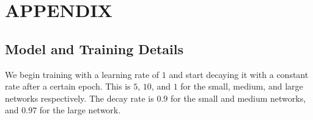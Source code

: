 \appendix
\chapter{\LARGE APPENDIX}

\iffalse
\section{More detailed justification of Equation \eqref{eqn:Jaug_matching_logits}}
Here we use a more general approach to derive \eqref{eqn:Jaug_matching_logits} and we show that in contrast to approach of section \ref{section:RE}, the new approach works for any value of $\tau>0$. Recall from section \ref{section:RE} that the gradient of $\Jaug_t$ is equal to
\begin{equation*}
\mathop{\nabla}\Jaug_t
=\frac{1}{\tau}(\yhat_t-\ytilde_t).
\end{equation*}
Now putting the gradient equal to zero implies that $\yhat_{t,i}=\ytilde_{t,i}$ which is equivalent to
\begin{equation*}
\frac{\xp{\<h_t,w_i\>/\tau} }{\sum_{j\in V}\xp{\<h_t,w_j\>/\tau}} = \frac{\xp{\<u_t,l_i\>/\tau} }{\sum_{j\in V}\xp{\<u_t,l_j\>/\tau}}.
\end{equation*}
Letting
\begin{align*}
a_i &= \xp{\<h_t,w_i\>/\tau},\\
b_i &= \xp{\<u_t,l_i\>/\tau}, \\
\end{align*}
this turns into
\begin{equation*}
\frac{a_i}{\sum_{j \in V} a_j}=\frac{b_i}{\sum_{j \in V} b_j} \Longrightarrow \frac{a_i}{b_i} = \frac{\sum_{j \in V} a_j}{\sum_{j \in V} b_j},
\end{equation*}
for $i \in V$. This essentially means that the ratio $a_i/b_i=C$ is fixed over the entire vocabulary. By taking logarithm from this equation and by using the definition of $a_i$ and $b_i$, we obtain that
\begin{equation*}
\<h_t,w_i\>/\tau - \<u_t,l_i\>/\tau = \log C,
\end{equation*}
which immediately implies
\begin{equation*}
Wh_t - L^T u_t = D \mathbf{1},
\end{equation*}
where $D= \tau \log C$.
\fi

\section{Model and Training Details}
\label{section:Train-details}
We begin training with a learning rate of $1$ and start decaying it with a constant rate after a certain epoch.
This is $5$, $10$, and $1$ for the small, medium, and large networks respectively.
The decay rate is $0.9$ for the small and medium networks, and $0.97$ for the large network. 

